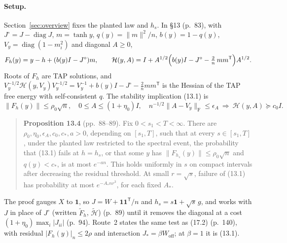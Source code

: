 \documentclass[11pt]{article}
\newcommand{\norm}[1]{\lVert #1\rVert}
\newcommand{\ploc}[2]{#1}
\begin{document}
\paragraph{Setup.}
Section~\ref{sec:overview} fixes the planted law and $h_s$. In \S13
\ploc{(p.~83)}{profile-positive.tex:5--30}, with $J^\circ=J-\operatorname{diag}J$,
$m=\tanh y$, $q(y)=\norm m^2/n$, $b(y)=1-q(y)$, $V_y=\operatorname{diag}(1-m_i^2)$
and diagonal $A\ge0$,
\[
 F_h(y)=y-h+(b(y)I-J^\circ)m,\qquad
 \mathcal H(y,A)=I+A^{1/2}\Bigl(b(y)I-J^\circ-\tfrac2n\,mm^{\mathsf T}\Bigr)A^{1/2}.
\]
Roots of $F_h$ are TAP solutions, and
$V_y^{-1/2}\mathcal H(y,V_y)V_y^{-1/2}=V_y^{-1}+b(y)I-J^\circ-\frac2nmm^{\mathsf T}$
is the Hessian of the TAP free energy with self-consistent $q$. The stability
implication \ploc{(13.1)}{profile-positive.tex:22--30} is
\[
 \norm{F_h(y)}\le\rho_0\sqrt n,\quad 0\le A\le(1+\eta_0)I,\quad
 n^{-1/2}\norm{A-V_y}_{\mathrm F}\le\epsilon_A
 \ \Longrightarrow\ \mathcal H(y,A)\succeq c_0I .
\]
\begin{quote}
\textbf{Proposition 13.4} \ploc{(pp.~88--89)}{profile-positive.tex:442--466}.
Fix $0<s_1<T<\infty$. There are $\rho_0,\eta_0,\epsilon_A,c_0,c_*,a>0$,
depending on $[s_1,T]$, such that at every $s\in[s_1,T]$, under the planted
law restricted to the spectral event, the probability that (13.1) fails at
$h=h_s$, or that some $y$ has $\norm{F_{h_s}(y)}\le\rho_0\sqrt n$ and
$q(y)<c_*$, is at most $e^{-an}$. This holds uniformly in $s$ on compact
intervals after decreasing the residual threshold. At small $r=\sqrt s$,
failure of (13.1) has probability at most $e^{-A_*nr^3}$, for each fixed $A_*$.
\end{quote}
The proof gauges $X$ to $\mathbf 1$, so $J=W+\mathbf 1\mathbf 1^{\mathsf T}/n$ and
$h_s=s\mathbf 1+\sqrt s\,g$, and works with $J$ in place of $J^\circ$ (written
$\widetilde F_h$, $\widetilde{\mathcal H}$) \ploc{(p.~89)}{profile-positive.tex:475--483}
until it removes the diagonal at a cost $(1+\eta_0)\max_i|J_{ii}|$
\ploc{(p.~94)}{profile-positive.tex:936--949}. Route~2 states the same test as
\ploc{(17.2)}{cap-classical.tex:24--38} (p.~140), with residual
$|F_h(y)|_n\le2\rho$ and interaction $J_*=\beta W_{\mathrm{off}}$; at $\beta=1$ it
is (13.1).
\end{document}
